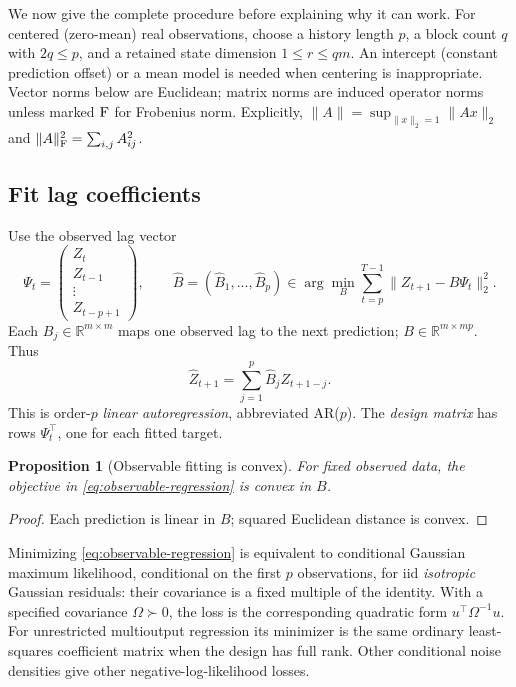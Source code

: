 \documentclass[11pt,twoside]{article}
\newcommand{\R}{\mathbb R}
\newtheorem{proposition}[theorem]{Proposition}
\theoremstyle{definition}
\theoremstyle{remark}
\begin{document}
We now give the complete procedure before explaining why it can work.
For centered (zero-mean) real observations, choose a history length \(p\), a block
count \(q\) with \(2q\le p\), and a retained state dimension \(1\le r\le qm\).
An intercept (constant prediction offset) or a mean model is needed when centering is inappropriate.
Vector norms below are Euclidean; matrix norms are induced operator norms
unless marked \({\rm F}\) for Frobenius norm.
Explicitly, \(\|A\|=\sup_{\|x\|_2=1}\|Ax\|_2\) and
\(\|A\|_{\rm F}^2=\sum_{i,j}A_{ij}^2\).

\subsection{Fit lag coefficients}

Use the observed lag vector
\begin{equation}
 \Psi_t=\begin{pmatrix}Z_t\\Z_{t-1}\\\vdots\\Z_{t-p+1}\end{pmatrix},
 \qquad \widehat B=(\widehat B_1,\ldots,\widehat B_p)
 \in\arg\min_B\sum_{t=p}^{T-1}\|Z_{t+1}-B\Psi_t\|_2^2 .
 \label{eq:observable-regression}
\end{equation}
Each \(B_j\in\R^{m\times m}\) maps one observed lag to the next
prediction; \(B\in\R^{m\times mp}\). Thus
\begin{equation}
 \widehat Z_{t+1}=\sum_{j=1}^p\widehat B_jZ_{t+1-j}.
 \label{eq:linear-ar}
\end{equation}
This is order-\(p\) \emph{linear autoregression}, abbreviated AR(\(p\)).
The \emph{design matrix} has rows \(\Psi_t^\top\), one for each fitted target.
\begin{proposition}[Observable fitting is convex]
\label{prop:observable-regression}
For fixed observed data, the objective in
\cref{eq:observable-regression} is convex in \(B\).
\end{proposition}
\begin{proof}
Each prediction is linear in \(B\); squared Euclidean distance is convex.
\end{proof}

Minimizing \cref{eq:observable-regression} is equivalent to conditional
Gaussian maximum likelihood, conditional on the
first \(p\) observations, for iid \emph{isotropic} Gaussian residuals:
their covariance is a fixed multiple of the identity. With a specified covariance \(\Omega\succ0\), the loss is
the corresponding quadratic form
\(u^\top\Omega^{-1}u\). For unrestricted multioutput regression its
minimizer is the same ordinary least-squares coefficient matrix when the
design has full rank. Other conditional noise densities give other
negative-log-likelihood losses.
\end{document}
